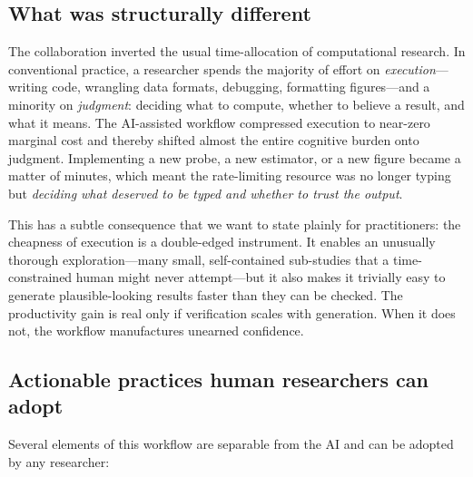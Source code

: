 \documentclass[11pt]{article}
\begin{document}
\subsection{What was structurally different}

The collaboration inverted the usual time-allocation of computational research. In
conventional practice, a researcher spends the majority of effort on
\emph{execution}---writing code, wrangling data formats, debugging, formatting
figures---and a minority on \emph{judgment}: deciding what to compute, whether to
believe a result, and what it means. The AI-assisted workflow compressed execution
to near-zero marginal cost and thereby shifted almost the entire cognitive burden
onto judgment. Implementing a new probe, a new estimator, or a new figure became a
matter of minutes, which meant the rate-limiting resource was no longer typing but
\emph{deciding what deserved to be typed and whether to trust the output}.

This has a subtle consequence that we want to state plainly for practitioners: the
cheapness of execution is a double-edged instrument. It enables an unusually
thorough exploration---many small, self-contained sub-studies that a
time-constrained human might never attempt---but it also makes it trivially easy to
generate plausible-looking results faster than they can be checked. The
productivity gain is real only if verification scales with generation. When it does
not, the workflow manufactures unearned confidence.

\subsection{Actionable practices human researchers can adopt}

Several elements of this workflow are separable from the AI and can be adopted by
any researcher:
\end{document}
